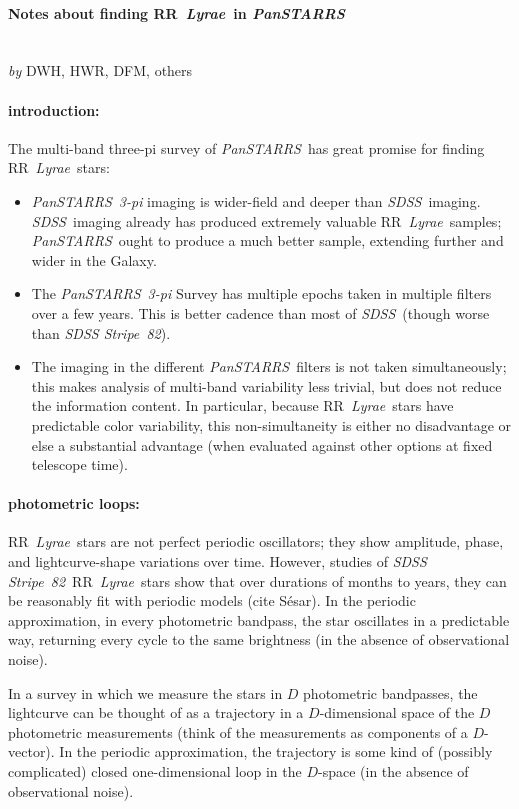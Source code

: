 \documentclass[12pt]{article}
\newcommand{\project}[1]{\textsl{#1}}
\newcommand{\ps}{\project{PanSTARRS}}
\newcommand{\sdss}{\project{SDSS}}
\newcommand{\stripe}{\project{SDSS Stripe~82}}
\newcommand{\rrl}{RR~\textit{Lyrae}}
\begin{document}
\paragraph{Notes about finding \rrl\ in \project{PanSTARRS}}
~ \\
\textsl{by} DWH, HWR, DFM, others

\paragraph{introduction:}
The multi-band three-pi survey of \ps\ has great promise for finding
\rrl\ stars:
\begin{itemize}
\item \ps\ \project{3-pi} imaging is wider-field and deeper than
  \sdss\ imaging.  \sdss\ imaging already has produced extremely
  valuable \rrl\ samples; \ps\ ought to produce a much better sample,
  extending further and wider in the Galaxy.
\item The \ps\ \project{3-pi} Survey has multiple epochs taken in
  multiple filters over a few years.  This is better cadence than most
  of \sdss\ (though worse than \stripe).
\item The imaging in the different \ps\ filters is not
  taken simultaneously; this makes analysis of multi-band variability
  less trivial, but does not reduce the information content.  In
  particular, because \rrl\ stars have predictable color variability,
  this non-simultaneity is either no disadvantage or else a
  substantial advantage (when evaluated against other options at fixed
  telescope time).
\end{itemize}

\paragraph{photometric loops:}
\rrl\ stars are not perfect periodic oscillators; they show amplitude,
phase, and lightcurve-shape variations over time.  However, studies of
\stripe\ \rrl\ stars show that over durations of
months to years, they can be reasonably fit with periodic models (cite
S\'esar).  In the periodic approximation, in every photometric
bandpass, the star oscillates in a predictable way, returning every
cycle to the same brightness (in the absence of observational noise).

In a survey in which we measure the stars in $D$ photometric
bandpasses, the lightcurve can be thought of as a trajectory in a
$D$-dimensional space of the $D$ photometric measurements (think of
the measurements as components of a $D$-vector).  In the periodic
approximation, the trajectory is some kind of (possibly complicated)
closed one-dimensional loop in the $D$-space (in the absence of
observational noise).
\end{document}
